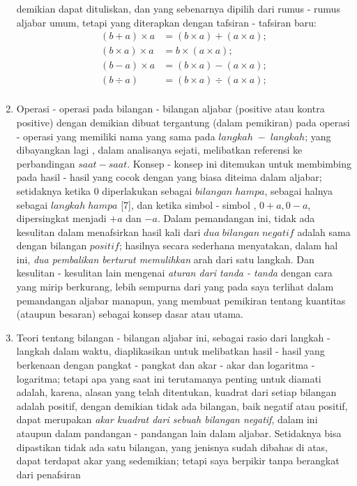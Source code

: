 \documentclass[a4paper, 12pt]{book}
\begin{document}
\begin{enumerate}
demikian dapat dituliskan, dan yang sebenarnya dipilih dari rumus - rumus
aljabar umum, tetapi yang diterapkan dengan tafsiran - tafsiran baru:
\begin{align*}
(b + a) \times a  &= (b \times a) + (a \times a); \\
(b \times a) \times a  &= b \times (a \times a); \\
(b - a) \times a  &= (b \times a) - (a \times a); \\
(b \div a) &= (b \times a) \div (a \times a); \\
\end{align*}
\item Operasi - operasi pada bilangan - bilangan aljabar (positive atau kontra
positive) dengan demikian dibuat tergantung (dalam pemikiran) pada operasi -
operasi yang memiliki nama yang sama pada $langkah\;-\;langkah$; yang dibayangkan
lagi , dalam analisanya sejati, melibatkan referensi ke perbandingan 
$saat-saat$. Konsep - konsep ini ditemukan untuk membimbing pada hasil -
hasil yang cocok dengan yang biasa diteima dalam aljabar; setidaknya ketika
0 diperlakukan sebagai $bilangan\;hampa$, sebagai halnya sebagai 
$langkah\;hampa$ [7], dan ketika simbol - simbol , $0 + a, 0 - a$, dipersingkat
menjadi $+a$ dan $-a$. Dalam pemandangan ini, tidak ada kesulitan dalam 
menafsirkan hasil kali dari $dua\; bilangan\; negatif$ adalah sama dengan 
bilangan $positif$; hasilnya secara sederhana menyatakan, dalam hal ini, 
\textit{dua pembalikan berturut
memulihkan} arah dari satu langkah. Dan kesulitan - kesulitan lain mengenai
\textit{aturan dari tanda - tanda} dengan cara yang mirip berkurang, lebih
sempurna dari yang pada saya terlihat dalam pemandangan aljabar manapun, yang
membuat pemikiran tentang kuantitas (ataupun besaran) sebagai konsep dasar 
atau utama.
\item Teori tentang bilangan - bilangan aljabar ini, sebagai rasio dari langkah
 - langkah dalam waktu, diaplikasikan untuk melibatkan hasil - hasil yang
berkenaan dengan pangkat - pangkat dan akar - akar dan logaritma - logaritma;
tetapi apa yang saat ini terutamanya penting untuk diamati adalah, karena, 
alasan yang telah ditentukan, kuadrat dari setiap bilangan adalah positif, 
dengan demikian tidak ada bilangan, baik negatif atau positif, dapat merupakan
\textit{akar kuadrat dari sebuah bilangan negatif}, dalam ini ataupun dalam
pandangan - pandangan lain dalam aljabar. Setidaknya bisa dipastikan
tidak ada satu bilangan, yang jenisnya sudah dibahas di atas, dapat terdapat
akar yang sedemikian; tetapi saya berpikir tanpa berangkat dari penafsiran

\end{enumerate}
\end{document}
